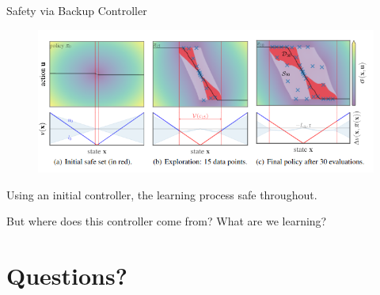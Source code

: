 \documentclass{beamer}
\begin{document}
\begin{frame}{Safety via Backup Controller}
  \begin{figure}
    \centering
    \includegraphics[width=0.9\linewidth]{assets/safety_region.png}
  \end{figure}
  Using an initial controller, the learning process safe
  throughout. 

  But where does this controller come from? What are we learning?
\end{frame}

\section{Questions?}
\end{document}
